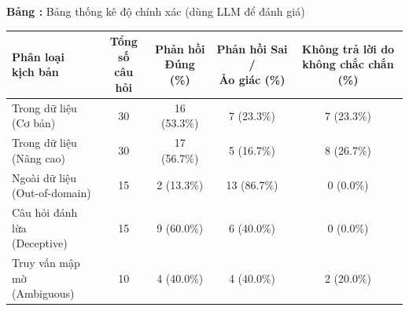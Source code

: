 \begin{table}[H]
\centering
{}
\textbf{Bảng \thetable:} Bảng thống kê độ chính xác (dùng LLM để đánh giá)
\label{tab:thong_ke_5_kich_ban}
\vspace{0.5em}
\begin{tabular}{|l|c|c|c|c|}
\hline
\makecell[l]{\textbf{Phân loại}\\\textbf{kịch bản}} & \makecell{\textbf{Tổng số}\\\textbf{câu hỏi}} & \makecell{\textbf{Phản hồi}\\\textbf{Đúng (\%)}} & \makecell{\textbf{Phản hồi Sai /}\\\textbf{Ảo giác (\%)}} & \makecell{\textbf{Không trả lời do}\\\textbf{không chắc chắn (\%)}} \\ \hline
\makecell[l]{Trong dữ liệu\\(Cơ bản)} & 30 & 16 (53.3\%) & 7 (23.3\%) & 7 (23.3\%) \\ \hline
\makecell[l]{Trong dữ liệu\\(Nâng cao)} & 30 & 17 (56.7\%) & 5 (16.7\%) & 8 (26.7\%) \\ \hline
\makecell[l]{Ngoài dữ liệu\\(Out-of-domain)} & 15 & 2 (13.3\%) & 13 (86.7\%) & 0 (0.0\%) \\ \hline
\makecell[l]{Câu hỏi đánh lừa\\(Deceptive)} & 15 & 9 (60.0\%) & 6 (40.0\%) & 0 (0.0\%) \\ \hline
\makecell[l]{Truy vấn mập mờ\\(Ambiguous)} & 10 & 4 (40.0\%) & 4 (40.0\%) & 2 (20.0\%) \\ \hline
\end{tabular}
\end{table}
